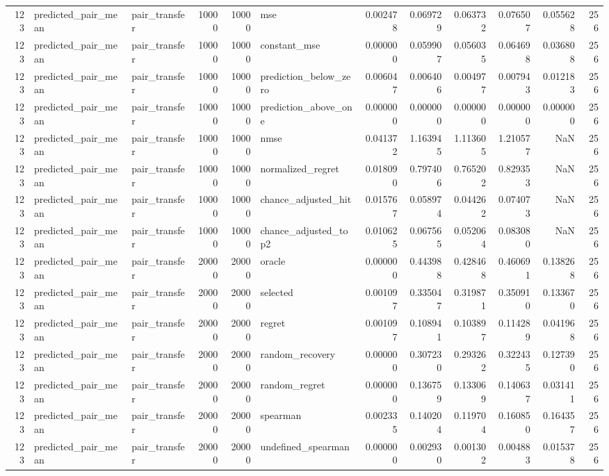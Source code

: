 \begin{tabular}{rllrrlrrrrrr}
123 & predicted_pair_mean & pair_transfer & 10000 & 10000 & mse & 0.002478 & 0.069729 & 0.063732 & 0.076507 & 0.055628 & 256 \\
123 & predicted_pair_mean & pair_transfer & 10000 & 10000 & constant_mse & 0.000000 & 0.059907 & 0.056035 & 0.064698 & 0.036808 & 256 \\
123 & predicted_pair_mean & pair_transfer & 10000 & 10000 & prediction_below_zero & 0.006047 & 0.006406 & 0.004977 & 0.007943 & 0.012183 & 256 \\
123 & predicted_pair_mean & pair_transfer & 10000 & 10000 & prediction_above_one & 0.000000 & 0.000000 & 0.000000 & 0.000000 & 0.000000 & 256 \\
123 & predicted_pair_mean & pair_transfer & 10000 & 10000 & nmse & 0.041372 & 1.163945 & 1.113605 & 1.210577 & NaN & 256 \\
123 & predicted_pair_mean & pair_transfer & 10000 & 10000 & normalized_regret & 0.018090 & 0.797406 & 0.765202 & 0.829353 & NaN & 256 \\
123 & predicted_pair_mean & pair_transfer & 10000 & 10000 & chance_adjusted_hit & 0.015767 & 0.058974 & 0.044262 & 0.074073 & NaN & 256 \\
123 & predicted_pair_mean & pair_transfer & 10000 & 10000 & chance_adjusted_top2 & 0.010625 & 0.067565 & 0.052064 & 0.083080 & NaN & 256 \\
123 & predicted_pair_mean & pair_transfer & 20000 & 20000 & oracle & 0.000000 & 0.443988 & 0.428468 & 0.460691 & 0.138268 & 256 \\
123 & predicted_pair_mean & pair_transfer & 20000 & 20000 & selected & 0.001097 & 0.335047 & 0.319871 & 0.350910 & 0.133670 & 256 \\
123 & predicted_pair_mean & pair_transfer & 20000 & 20000 & regret & 0.001097 & 0.108941 & 0.103897 & 0.114289 & 0.041968 & 256 \\
123 & predicted_pair_mean & pair_transfer & 20000 & 20000 & random_recovery & 0.000000 & 0.307230 & 0.293262 & 0.322435 & 0.127390 & 256 \\
123 & predicted_pair_mean & pair_transfer & 20000 & 20000 & random_regret & 0.000000 & 0.136759 & 0.133069 & 0.140637 & 0.031411 & 256 \\
123 & predicted_pair_mean & pair_transfer & 20000 & 20000 & spearman & 0.002335 & 0.140204 & 0.119704 & 0.160850 & 0.164357 & 256 \\
123 & predicted_pair_mean & pair_transfer & 20000 & 20000 & undefined_spearman & 0.000000 & 0.002930 & 0.001302 & 0.004883 & 0.015378 & 256 \\

\end{tabular}
